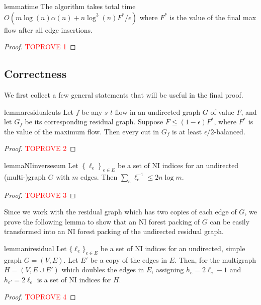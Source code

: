 \documentclass[11pt,a4paper]{article}
\newcommand{\eps}{\epsilon}
\begin{document}
\begin{restatable}{lemma}{time}
\label{lem:time}
The algorithm takes total time $O(m \log (n) \alpha(n) + n \log^3 (n) F^*/\eps)$ where $F^*$ is the value of the final max flow after all edge insertions.
\end{restatable}
\begin{proof}\textcolor{red}{TOPROVE 1}\end{proof}

\subsection{Correctness}
\label{sec:correctness}

We first collect a few general statements that will be useful in the final proof.

\begin{restatable}{lemma}{residualcuts}
\label{lem:residualcuts}
Let $f$ be any $s$-$t$ flow in an undirected graph $G$ of value $F$, and let $G_f$ be its corresponding residual graph. Suppose $F \le (1-\eps) F^*$, where $F^*$ is the value of the maximum flow. Then every cut in $G_f$ is at least $\eps/2$-balanced.
\end{restatable}
\begin{proof}\textcolor{red}{TOPROVE 2}\end{proof}

\begin{restatable}{lemma}{NIinversesum}
\label{lem:NIinversesum}
Let $\left\{ \ell_e \right\}_{e \in E}$ be a set of NI indices for an undirected (multi-)graph $G$ with $m$ edges. Then $\sum_e \ell_e^{-1} \le 2 n \log m$.
\end{restatable}
\begin{proof}\textcolor{red}{TOPROVE 3}\end{proof}

Since we work with the residual graph which has two copies of each edge of $G$, we prove the following lemma to show that an NI forest packing of $G$ can be easily transformed into an NI forest packing of the undirected residual graph.

\begin{restatable}{lemma}{niresidual}
\label{lem:niresidual}
Let $\{ \ell_e \}_{e \in E}$ be a set of NI indices for an undirected, simple graph $G = (V, E)$. Let $E'$ be a copy of the edges in $E$. Then, for the multigraph $H = (V, E \cup E')$ which doubles the edges in $E$, assigning $h_e = 2 \ell_e - 1$ and $h_{e'} = 2 \ell_e$ is a set of NI indices for $H$.
\end{restatable}
\begin{proof}\textcolor{red}{TOPROVE 4}\end{proof}
\end{document}
